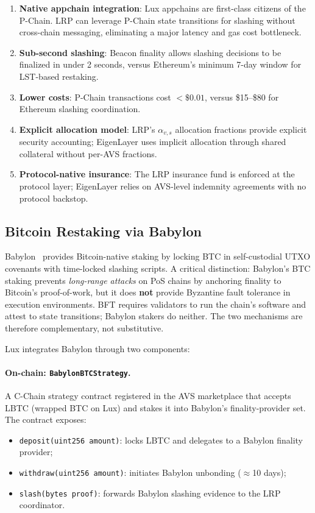 \begin{enumerate}[leftmargin=1.5em]
  \item \textbf{Native appchain integration}: Lux appchains are first-class citizens of the P-Chain.
    LRP can leverage P-Chain state transitions for slashing without cross-chain messaging,
    eliminating a major latency and gas cost bottleneck.
  \item \textbf{Sub-second slashing}: Beacon finality allows slashing decisions to be
    finalized in under 2 seconds, versus Ethereum's minimum 7-day window for LST-based restaking.
  \item \textbf{Lower costs}: P-Chain transactions cost $< \$0.01$, versus \$15--\$80 for
    Ethereum slashing coordination.
  \item \textbf{Explicit allocation model}: LRP's $\alpha_{v,s}$ allocation fractions provide
    explicit security accounting; EigenLayer uses implicit allocation through shared collateral
    without per-AVS fractions.
  \item \textbf{Protocol-native insurance}: The LRP insurance fund is enforced at the protocol
    layer; EigenLayer relies on AVS-level indemnity agreements with no protocol backstop.
\end{enumerate}

\subsection{Bitcoin Restaking via Babylon}
\label{sec:babylon}

Babylon~\cite{babylon2023bitcoin} provides Bitcoin-native staking by locking BTC in
self-custodial UTXO covenants with time-locked slashing scripts.  A critical distinction:
Babylon's BTC staking prevents \emph{long-range attacks} on PoS chains by anchoring
finality to Bitcoin's proof-of-work, but it does \textbf{not} provide Byzantine fault
tolerance in execution environments.  BFT requires validators to run the chain's software
and attest to state transitions; Babylon stakers do neither.  The two mechanisms are
therefore complementary, not substitutive.

Lux integrates Babylon through two components:

\paragraph{On-chain: \texttt{BabylonBTCStrategy}.}
A C-Chain strategy contract registered in the AVS marketplace that accepts LBTC (wrapped
BTC on Lux) and stakes it into Babylon's finality-provider set.  The contract exposes:
\begin{itemize}[leftmargin=1.5em]
  \item \texttt{deposit(uint256 amount)}: locks LBTC and delegates to a Babylon finality
    provider;
  \item \texttt{withdraw(uint256 amount)}: initiates Babylon unbonding ($\approx$10 days);
  \item \texttt{slash(bytes proof)}: forwards Babylon slashing evidence to the LRP
    coordinator.
\end{itemize}

